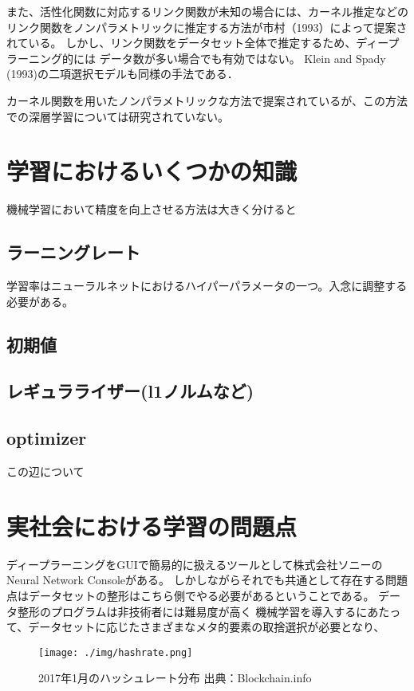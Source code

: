  また、活性化関数に対応するリンク関数が未知の場合には、カーネル推定などのリンク関数をノンパラメトリックに推定する方法が市村（1993）によって提案されている。
 しかし、リンク関数をデータセット全体で推定するため、ディープラーニング的には データ数が多い場合でも有効ではない。
 Klein and Spady (1993)の二項選択モデルも同様の手法である．

 カーネル関数を用いたノンパラメトリックな方法で提案されているが、この方法での深層学習については研究されていない。




\section{学習におけるいくつかの知識}
機械学習において精度を向上させる方法は大きく分けると
\subsection{ラーニングレート}
学習率はニューラルネットにおけるハイパーパラメータの一つ。入念に調整する必要がある。
\subsection{初期値}
\subsection{レギュラライザー(l1ノルムなど)}
\subsection{optimizer}
この辺について
\section{実社会における学習の問題点}
ディープラーニングをGUIで簡易的に扱えるツールとして株式会社ソニーのNeural Network Consoleがある。
しかしながらそれでも共通として存在する問題点はデータセットの整形はこちら側でやる必要があるということである。
データ整形のプログラムは非技術者には難易度が高く
機械学習を導入するにあたって、データセットに応じたさまざまなメタ的要素の取捨選択が必要となり、

\begin{figure}[h]
    \begin{center}
        \texttt{[image: ./img/hashrate.png]}
        \caption{2017年1月のハッシュレート分布 出典：Blockchain.info\cite{bitcoinhashrate}}
        \label{img:hashrate}
    \end{center}
\end{figure}
\fi
